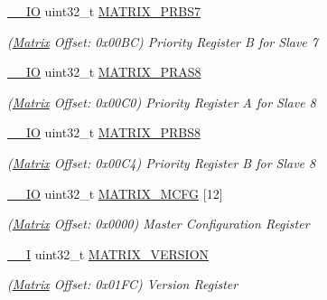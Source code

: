 \begin{DoxyCompactItemize}
\mbox{\label{structMatrix_ae4d64f4f184b0cabe4cf3bf19e1242ff}} 
\mbox{\hyperlink{core__cm7_8h_aec43007d9998a0a0e01faede4133d6be}{\+\_\+\+\_\+\+IO}} uint32\+\_\+t \mbox{\hyperlink{structMatrix_ae4d64f4f184b0cabe4cf3bf19e1242ff}{M\+A\+T\+R\+I\+X\+\_\+\+P\+R\+B\+S7}}
\begin{DoxyCompactList}\small\item\em (\mbox{\hyperlink{structMatrix}{Matrix}} Offset\+: 0x00\+BC) Priority Register B for Slave 7 \end{DoxyCompactList}\item 
\mbox{\label{structMatrix_aa0881372a0e3280b6ea0ea3b0e1fb9b1}} 
\mbox{\hyperlink{core__cm7_8h_aec43007d9998a0a0e01faede4133d6be}{\+\_\+\+\_\+\+IO}} uint32\+\_\+t \mbox{\hyperlink{structMatrix_aa0881372a0e3280b6ea0ea3b0e1fb9b1}{M\+A\+T\+R\+I\+X\+\_\+\+P\+R\+A\+S8}}
\begin{DoxyCompactList}\small\item\em (\mbox{\hyperlink{structMatrix}{Matrix}} Offset\+: 0x00\+C0) Priority Register A for Slave 8 \end{DoxyCompactList}\item 
\mbox{\label{structMatrix_a7071746715f4c80739bd4edd57af3113}} 
\mbox{\hyperlink{core__cm7_8h_aec43007d9998a0a0e01faede4133d6be}{\+\_\+\+\_\+\+IO}} uint32\+\_\+t \mbox{\hyperlink{structMatrix_a7071746715f4c80739bd4edd57af3113}{M\+A\+T\+R\+I\+X\+\_\+\+P\+R\+B\+S8}}
\begin{DoxyCompactList}\small\item\em (\mbox{\hyperlink{structMatrix}{Matrix}} Offset\+: 0x00\+C4) Priority Register B for Slave 8 \end{DoxyCompactList}\item 
\mbox{\label{structMatrix_a560c3335c30fcc7395a6a7af8588d628}} 
\mbox{\hyperlink{core__cm7_8h_aec43007d9998a0a0e01faede4133d6be}{\+\_\+\+\_\+\+IO}} uint32\+\_\+t \mbox{\hyperlink{structMatrix_a560c3335c30fcc7395a6a7af8588d628}{M\+A\+T\+R\+I\+X\+\_\+\+M\+C\+FG}} \mbox{[}12\mbox{]}
\begin{DoxyCompactList}\small\item\em (\mbox{\hyperlink{structMatrix}{Matrix}} Offset\+: 0x0000) Master Configuration Register \end{DoxyCompactList}\item 
\mbox{\label{structMatrix_a2fe4e389bcdc0f07a6435f85d6e17972}} 
\mbox{\hyperlink{core__cm7_8h_af63697ed9952cc71e1225efe205f6cd3}{\+\_\+\+\_\+I}} uint32\+\_\+t \mbox{\hyperlink{structMatrix_a2fe4e389bcdc0f07a6435f85d6e17972}{M\+A\+T\+R\+I\+X\+\_\+\+V\+E\+R\+S\+I\+ON}}
\begin{DoxyCompactList}\small\item\em (\mbox{\hyperlink{structMatrix}{Matrix}} Offset\+: 0x01\+FC) Version Register \end{DoxyCompactList}\end{DoxyCompactItemize}


